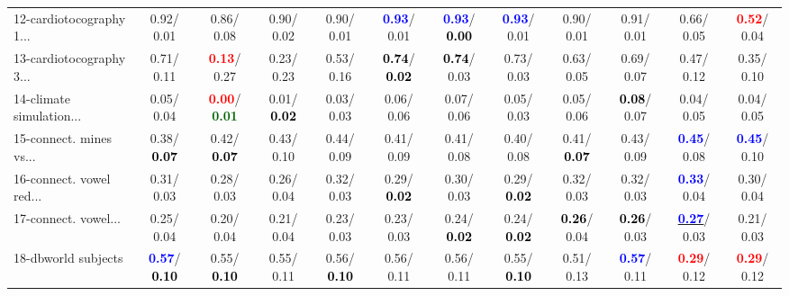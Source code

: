 \begin{table}[h]
\begin{center}
{\begin{tabular}{lc|c|c|c|c|c|c|c|c|c|c}
12-cardiotocography 1... &   0.92/  0.01 &   0.86/  0.08 &   0.90/  0.02 &   0.90/  0.01 & \textcolor{blue}{\textbf{  0.93}}/  0.01 & \textcolor{blue}{\textbf{  0.93}}/\textcolor{black}{\textbf{  0.00}} & \textcolor{blue}{\textbf{  0.93}}/  0.01 &   0.90/  0.01 &   0.91/  0.01 &   0.66/  0.05 & \textcolor{red}{\textbf{  0.52}}/  0.04 \\
13-cardiotocography 3... &   0.71/  0.11 & \textcolor{red}{\textbf{  0.13}}/  0.27 &   0.23/  0.23 &   0.53/  0.16 & \textcolor{black}{\textbf{  0.74}}/\textcolor{black}{\textbf{  0.02}} & \textcolor{black}{\textbf{  0.74}}/  0.03 &   0.73/  0.03 &   0.63/  0.05 &   0.69/  0.07 &   0.47/  0.12 &   0.35/  0.10 \\
14-climate simulation... &   0.05/  0.04 & \textcolor{red}{\textbf{  0.00}}/\textcolor{darkgreen}{\textbf{  0.01}} &   0.01/\textcolor{black}{\textbf{  0.02}} &   0.03/  0.03 &   0.06/  0.06 &   0.07/  0.06 &   0.05/  0.03 &   0.05/  0.06 & \textcolor{black}{\textbf{  0.08}}/  0.07 &   0.04/  0.05 &   0.04/  0.05 \\ \hline
15-connect. mines vs... &   0.38/\textcolor{black}{\textbf{  0.07}} &   0.42/\textcolor{black}{\textbf{  0.07}} &   0.43/  0.10 &   0.44/  0.09 &   0.41/  0.09 &   0.41/  0.08 &   0.40/  0.08 &   0.41/\textcolor{black}{\textbf{  0.07}} &   0.43/  0.09 & \textcolor{blue}{\textbf{  0.45}}/  0.08 & \textcolor{blue}{\textbf{  0.45}}/  0.10 \\
16-connect. vowel red... &   0.31/  0.03 &   0.28/  0.03 &   0.26/  0.04 &   0.32/  0.03 &   0.29/\textcolor{black}{\textbf{  0.02}} &   0.30/  0.03 &   0.29/\textcolor{black}{\textbf{  0.02}} &   0.32/  0.03 &   0.32/  0.03 & \textcolor{blue}{\textbf{  0.33}}/  0.04 &   0.30/  0.04 \\
17-connect. vowel... &   0.25/  0.04 &   0.20/  0.04 &   0.21/  0.04 &   0.23/  0.03 &   0.23/  0.03 &   0.24/\textcolor{black}{\textbf{  0.02}} &   0.24/\textcolor{black}{\textbf{  0.02}} & \textcolor{black}{\textbf{  0.26}}/  0.04 & \textcolor{black}{\textbf{  0.26}}/  0.03 & \underline{\textcolor{blue}{\textbf{  0.27}}}/  0.03 &   0.21/  0.03 \\
18-dbworld subjects & \textcolor{blue}{\textbf{  0.57}}/\textcolor{black}{\textbf{  0.10}} &   0.55/\textcolor{black}{\textbf{  0.10}} &   0.55/  0.11 &   0.56/\textcolor{black}{\textbf{  0.10}} &   0.56/  0.11 &   0.56/  0.11 &   0.55/\textcolor{black}{\textbf{  0.10}} &   0.51/  0.13 & \textcolor{blue}{\textbf{  0.57}}/  0.11 & \textcolor{red}{\textbf{  0.29}}/  0.12 & \textcolor{red}{\textbf{  0.29}}/  0.12 \\

\end{tabular}}
\end{center}
\end{table}
